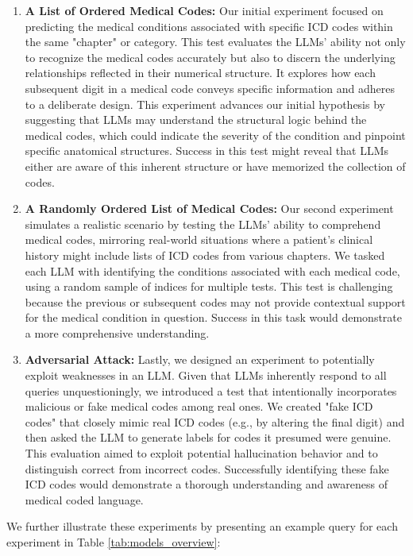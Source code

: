 \documentclass[11pt]{article}
\theoremstyle{plain}
\theoremstyle{definition}
\theoremstyle{remark}
\begin{document}
\begin{enumerate}
    \item \textbf{A List of Ordered Medical Codes:} Our initial experiment focused on predicting the medical conditions associated with specific ICD codes within the same "chapter" or category. This test evaluates the LLMs' ability not only to recognize the medical codes accurately but also to discern the underlying relationships reflected in their numerical structure. It explores how each subsequent digit in a medical code conveys specific information and adheres to a deliberate design. This experiment advances our initial hypothesis by suggesting that LLMs may understand the structural logic behind the medical codes, which could indicate the severity of the condition and pinpoint specific anatomical structures. Success in this test might reveal that LLMs either are aware of this inherent structure or have memorized the collection of codes.

    \item \textbf{A Randomly Ordered List of Medical Codes:} Our second experiment simulates a realistic scenario by testing the LLMs' ability to comprehend medical codes, mirroring real-world situations where a patient's clinical history might include lists of ICD codes from various chapters. We tasked each LLM with identifying the conditions associated with each medical code, using a random sample of indices for multiple tests. This test is challenging because the previous or subsequent codes may not provide contextual support for the medical condition in question. Success in this task would demonstrate a more comprehensive understanding.
    
    \item \textbf{Adversarial Attack:} Lastly, we designed an experiment to potentially exploit weaknesses in an LLM. Given that LLMs inherently respond to all queries unquestioningly, we introduced a test that intentionally incorporates malicious or fake medical codes among real ones. We created "fake ICD codes" that closely mimic real ICD codes (e.g., by altering the final digit) and then asked the LLM to generate labels for codes it presumed were genuine. This evaluation aimed to exploit potential hallucination behavior and to distinguish correct from incorrect codes. Successfully identifying these fake ICD codes would demonstrate a thorough understanding and awareness of medical coded language.
\end{enumerate}

\noindent We further illustrate these experiments by presenting an example query for each experiment in Table \ref{tab:models_overview}:
\end{document}

